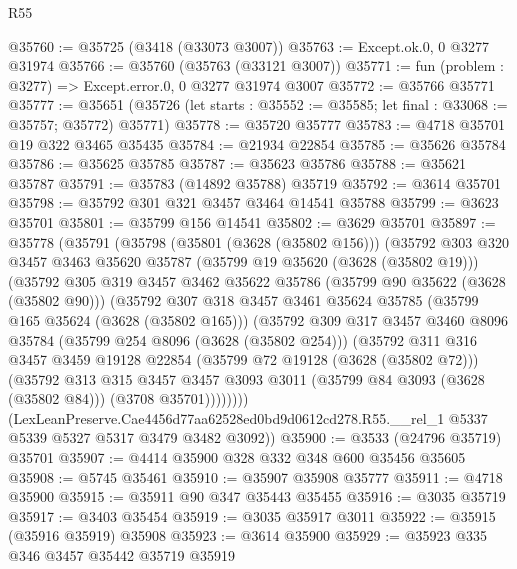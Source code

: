\begin{lexlean}{R55}
\begin{coremodule}
@35760 := @35725 (@3418 (@33073 @3007))
@35763 := Except.ok.{0, 0} @3277 @31974
@35766 := @35760 (@35763 (@33121 @3007))
@35771 := fun (problem : @3277) => Except.error.{0, 0} @3277 @31974 @3007
@35772 := @35766 @35771
@35777 := @35651
    (@35726 (let starts : @35552 := @35585; let final : @33068 := @35757; @35772) @35771)
@35778 := @35720 @35777
@35783 := @4718 @35701 @19 @322 @3465 @35435
@35784 := @21934 @22854
@35785 := @35626 @35784
@35786 := @35625 @35785
@35787 := @35623 @35786
@35788 := @35621 @35787
@35791 := @35783 (@14892 @35788) @35719
@35792 := @3614 @35701
@35798 := @35792 @301 @321 @3457 @3464 @14541 @35788
@35799 := @3623 @35701
@35801 := @35799 @156 @14541
@35802 := @3629 @35701
@35897 := @35778
    (@35791
      (@35798
        (@35801 (@3628 (@35802 @156)))
        (@35792
          @303
          @320
          @3457
          @3463
          @35620
          @35787
          (@35799 @19 @35620 (@3628 (@35802 @19)))
          (@35792
            @305
            @319
            @3457
            @3462
            @35622
            @35786
            (@35799 @90 @35622 (@3628 (@35802 @90)))
            (@35792
              @307
              @318
              @3457
              @3461
              @35624
              @35785
              (@35799 @165 @35624 (@3628 (@35802 @165)))
              (@35792
                @309
                @317
                @3457
                @3460
                @8096
                @35784
                (@35799 @254 @8096 (@3628 (@35802 @254)))
                (@35792
                  @311
                  @316
                  @3457
                  @3459
                  @19128
                  @22854
                  (@35799 @72 @19128 (@3628 (@35802 @72)))
                  (@35792
                    @313
                    @315
                    @3457
                    @3457
                    @3093
                    @3011
                    (@35799 @84 @3093 (@3628 (@35802 @84)))
                    (@3708 @35701))))))))
      (LexLeanPreserve.Cae4456d77aa62528ed0bd9d0612cd278.R55.__rel_1
        @5337
        @5339
        @5327
        @5317
        @3479
        @3482
        @3092))
@35900 := @3533 (@24796 @35719) @35701
@35907 := @4414 @35900 @328 @332 @348 @600 @35456 @35605
@35908 := @5745 @35461
@35910 := @35907 @35908 @35777
@35911 := @4718 @35900
@35915 := @35911 @90 @347 @35443 @35455
@35916 := @3035 @35719
@35917 := @3403 @35454
@35919 := @3035 @35917 @3011
@35922 := @35915 (@35916 @35919) @35908
@35923 := @3614 @35900
@35929 := @35923 @335 @346 @3457 @35442 @35719 @35919

\end{coremodule}
\end{lexlean}

